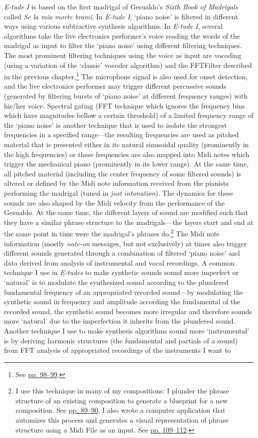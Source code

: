 \emph{E-tude I} is based on the first madrigal of Gesualdo's \emph{Sixth Book of Madrigals} called \emph{Se la mia morte brami}. In \emph{E-tude I}, `piano noise' is filtered in different ways using various subtractive synthesis algorithms. In \emph{E-tude I}, several algorithms take the live electronics performer's voice reading the words of the madrigal as input to filter the `piano noise' using different filtering techniques. The most prominent filtering techniques using the voice as input are vocoding (using a variation of the `classic' vocoder algorithm) and the FFTFilter described in the previous chapter.\footnote{See \hyperlink{fftfilter}{pp. 98--99}.} The microphone signal is also used for onset detection, and the live electronics performer may trigger different percussive sounds (generated by filtering bursts of `piano noise' at different frequency ranges) with his/her voice.  Spectral gating (FFT technique which ignores the frequency bins which have magnitudes bellow a certain threshold) of a limited frequency range of the `piano noise' is another technique that is used to isolate the strongest frequencies in a specified range---the resulting frequencies are used as pitched material that is presented either in its natural sinusoidal quality (prominently in the high frequencies) or these frequencies are also mapped into Midi notes which trigger the mechanical piano (prominently in its lower range). At the same time, all pitched material (including the center frequency of some filtered sounds) is altered or defined by the Midi note information received from the pianists performing the madrigal (tuned in \emph{just intonation}). The dynamics for these sounds are also shaped by the Midi velocity from the performance of the Gesualdo. At the same time, the different layers of sound are modified such that they have a similar phrase structure to the madrigals---the layers start and end at the same point in time were the madrigal's phrases do.\footnote{I use this technique in many of my compositions: I plunder the phrase structure of an existing composition to generate a blueprint for a new composition. See \hyperlink{macroplunder}{pp. 89--90}. I also wrote a computer application that automizes this process and generates a visual representation of phrase structure using a Midi File as an input. See \hyperlink{scorevisual}{pp. 109--112}.} The Midi note information (mostly \emph{note-on} messages, but not exclusively) at times also trigger different sounds generated through a combination of filtered `piano noise' and data derived from analysis of instrumental and vocal recordings. A common technique I use in \emph{E-tudes} to make synthetic sounds sound more imperfect or `natural' is to modulate the synthesized sound according to the plundered fundamental frequency of an appropriated recorded sound---by modulating the synthetic sound in frequency and amplitude according the fundamental of the recorded sound, the synthetic sound becomes more irregular and therefore sounds more `natural' due to the imperfection it inherits from the plundered sound. Another technique I use to make synthesis algorithms sound more `instrumental' is by deriving harmonic structures (the fundamental and partials of a sound) from FFT analysis of appropriated recordings of the instruments I want to 